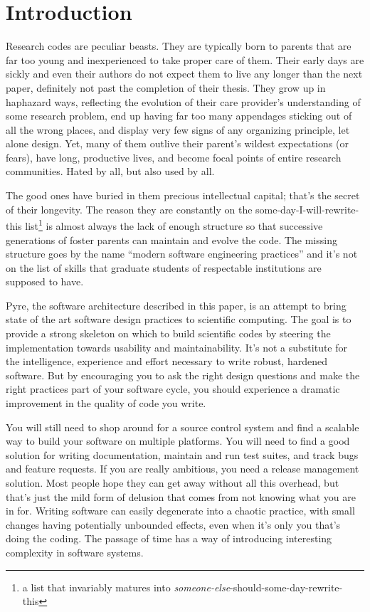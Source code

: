 %


\section{Introduction}
\label{sec:introduction}

Research codes are peculiar beasts. They are typically born to parents that are far too young
and inexperienced to take proper care of them. Their early days are sickly and even their
authors do not expect them to live any longer than the next paper, definitely not past the
completion of their thesis. They grow up in haphazard ways, reflecting the evolution of their
care provider's understanding of some research problem, end up having far too many appendages
sticking out of all the wrong places, and display very few signs of any organizing principle,
let alone design.  Yet, many of them outlive their parent's wildest expectations (or fears),
have long, productive lives, and become focal points of entire research communities. Hated by
all, but also used by all.

The good ones have buried in them precious intellectual capital; that's the secret of their
longevity. The reason they are constantly on the some-day-I-will-rewrite-this list\footnote{a
  list that invariably matures into {\em someone-else}-should-some-day-rewrite-this} is almost
always the lack of enough structure so that successive generations of foster parents can
maintain and evolve the code. The missing structure goes by the name ``modern software
engineering practices'' and it's not on the list of skills that graduate students of
respectable institutions are supposed to have.

Pyre, the software architecture described in this paper, is an attempt to bring state of the
art software design practices to scientific computing. The goal is to provide a strong skeleton
on which to build scientific codes by steering the implementation towards usability and
maintainability. It's not a substitute for the intelligence, experience and effort necessary to
write robust, hardened software. But by encouraging you to ask the right design questions and
make the right practices part of your software cycle, you should experience a dramatic
improvement in the quality of code you write.

You will still need to shop around for a source control system and find a scalable way to build
your software on multiple platforms. You will need to find a good solution for writing
documentation, maintain and run test suites, and track bugs and feature requests. If you are
really ambitious, you need a release management solution. Most people hope they can get away
without all this overhead, but that's just the mild form of delusion that comes from not
knowing what you are in for.  Writing software can easily degenerate into a chaotic practice,
with small changes having potentially unbounded effects, even when it's only you that's doing
the coding. The passage of time has a way of introducing interesting complexity in software
systems.

